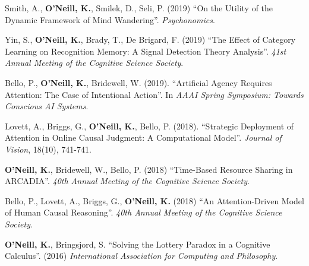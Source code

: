 Smith, A., \textbf{O'Neill, K.}, Smilek, D., Seli, P. (2019) ``On the
Utility of the Dynamic Framework of Mind Wandering''. \emph{Psychonomics}.

Yin, S., \textbf{O'Neill, K.}, Brady, T., De Brigard, F. (2019) ``The
Effect of Category Learning on Recognition Memory: A Signal Detection
Theory Analysis''. \emph{41st Annual Meeting of the Cognitive Science
Society}.

Bello, P., \textbf{O'Neill, K.}, Bridewell, W. (2019). ``Artificial
Agency Requires Attention: The Case of Intentional
Action''. In \emph{AAAI Spring Symposium: Towards Conscious AI
Systems}.

Lovett, A., Briggs, G., \textbf{O'Neill, K.}, Bello,
P. (2018). ``Strategic Deployment of Attention in Online Causal
Judgment: A Computational Model''. \emph{Journal of Vision}, 18(10),
741-741.

\textbf{O'Neill, K.}, Bridewell, W., Bello, P. (2018) ``Time-Based
Resource Sharing in ARCADIA''. \emph{40th Annual Meeting of the
  Cognitive Science Society}.

Bello, P., Lovett, A., Briggs, G., \textbf{O'Neill, K.} (2018) ``An
Attention-Driven Model of Human Causal Reasoning''. \emph{40th Annual
Meeting of the Cognitive Science Society}.
  
\textbf{O’Neill, K.}, Bringsjord, S. ``Solving the Lottery Paradox in a
Cognitive Calculus''. (2016) \emph{International Association for
Computing and Philosophy}.
